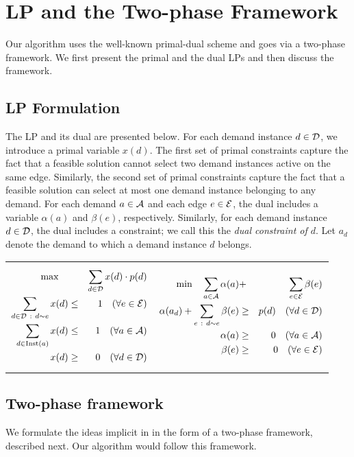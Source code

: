 \documentclass[11pt]{article}
\newcommand{\calA} {{\cal A}}
\newcommand{\calE} {{\cal E}}
\newcommand{\calD} {{\cal D}}
\newcommand{\Inst} {{\rm Inst}}
\begin{document}
\section{LP and the Two-phase Framework}
Our algorithm uses the well-known primal-dual scheme and goes via a two-phase framework.
We first present the primal and the dual LPs and then discuss the framework.

\subsection{LP Formulation}
The LP and its dual are presented below.
For each demand instance $d\in \calD$, we introduce a primal variable $x(d)$.
The first set of primal constraints capture the fact that a feasible solution cannot
select two demand instances active on the same edge.
Similarly, the second set of primal constraints capture the fact that a feasible solution
can select at most one demand instance belonging to any demand.
For each demand $a\in \calA$ and each edge $e\in \calE$, the dual includes a variable $\alpha(a)$ and $\beta(e)$,
respectively. Similarly, for each demand instance $d\in \calD$, 
the dual includes a constraint; we call this the {\em dual constraint of $d$}.
Let $a_d$ denote the demand to which a demand instance $d$ belongs.
\begin{tabular}{p{3in}p{3in}}
\begin{eqnarray*}
\max \quad & & \sum_{d \in {\calD}} x(d) \cdot p(d) \\
\sum_{d\in \calD ~:~ d \sim  e} x(d) & \leq & 1 \quad  (\forall e\in \calE) \\
\sum_{d \in \Inst(a)} x(d) & \leq & 1 \quad (\forall a\in \calA) \\
x(d) & \geq & 0 \quad (\forall d\in \calD)
\end{eqnarray*}
&
\begin{eqnarray*}
\min \quad \sum_{a \in {\calA}} \alpha(a) &+& \sum_{e\in \calE} \beta(e) \\
\alpha(a_d) + \sum_{e~:~ d \sim  e} \beta(e) & \geq & p(d) \quad (\forall d\in \calD)\\
\alpha(a) & \geq & 0 \quad (\forall a\in \calA)\\
\beta(e) & \geq & 0 \quad (\forall e\in \calE)
\end{eqnarray*}
\end{tabular}



\subsection{Two-phase framework}
We formulate the ideas implicit in \cite{Pancj,Bar-Noy-Jacm,Lewin-Eytan} 
in the form of a two-phase framework, described next. Our algorithm would follow this framework.
\end{document}
